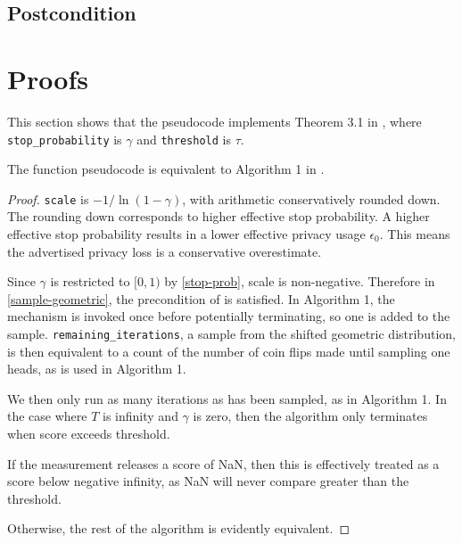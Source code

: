 \documentclass{article}
\begin{document}
\subsection*{Postcondition}

\section{Proofs}
This section shows that the pseudocode implements Theorem 3.1 in \cite{liu2018privateselectionprivatecandidates}, where 
\texttt{stop\_probability} is $\gamma$ and
\texttt{threshold} is $\tau$.

\begin{theorem}
    \label{algorithm-equivalence}
    The function pseudocode is equivalent to Algorithm 1 in \cite{liu2018privateselectionprivatecandidates}.
\end{theorem}

\begin{proof}
    \texttt{scale} is $-1 / \ln(1 - \gamma)$, with arithmetic conservatively rounded down.
    The rounding down corresponds to higher effective stop probability.
    A higher effective stop probability results in a lower effective privacy usage $\epsilon_0$.
    This means the advertised privacy loss is a conservative overestimate.

    Since $\gamma$ is restricted to $[0, 1)$ by \ref{stop-prob}, scale is non-negative.
    Therefore in \ref{sample-geometric}, 
    the precondition of  is satisfied.
    In Algorithm 1, the mechanism is invoked once before potentially terminating, so one is added to the sample.
    \texttt{remaining\_iterations}, a sample from the shifted geometric distribution, 
    is then equivalent to a count of the number of coin flips made until sampling one heads,
    as is used in Algorithm 1.

    We then only run as many iterations as has been sampled, as in Algorithm 1.
    In the case where $T$ is infinity and $\gamma$ is zero, then the algorithm only terminates when score exceeds threshold.

    If the measurement releases a score of NaN, then this is effectively treated as a score below negative infinity, 
    as NaN will never compare greater than the threshold.

    Otherwise, the rest of the algorithm is evidently equivalent.
\end{proof}
\end{document}
